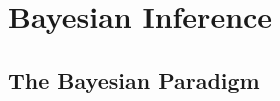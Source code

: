 \chapter{Bayesian Inference}\label{chap:bayesian}

\section{The Bayesian Paradigm}\label{sec:bayes_paradigm}
